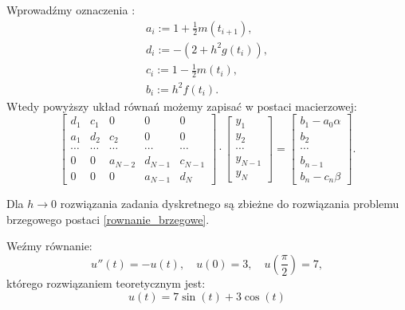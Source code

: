 \documentclass[notheorems]{beamer}
\begin{document}
\begin{frame}
\begin{small}
Wprowadźmy oznaczenia :
\begin{align*}
a_i:= 1 + \frac{1}{2}m(t_{i+1}),\\
d_i:= -(2+h^2 g(t_i)), \\
c_i:= 1 - \frac{1}{2}m(t_i), \\
b_i:= h^2 f(t_i).
\end{align*}
Wtedy powyższy układ równań możemy zapisać w postaci macierzowej:
\begin{equation}\label{macierz}
\left[ \begin{array}{ccccc}
d_1 & c_1 & 0 & 0 & 0 \\
a_1 & d_2 & c_2 & 0 & 0\\
\cdots & \cdots & \cdots &\cdots  &\cdots \\
0 & 0 & a_{N-2} & d_{N-1} & c_{N-1}\\
0 & 0 & 0 & a_{N-1} & d_N 
\end{array} \right] \cdot
\left[ \begin{array}{c}
y_1 \\
y_2 \\
\cdots \\
y_{N-1} \\
y_{N}  
\end{array} \right] =
\left[ \begin{array}{c}
b_1 - a_0\alpha\\
b_2 \\
\cdots \\
b_{n-1} \\
b_n -c_n\beta 
\end{array} \right] .
\end{equation}
\end{small}
\end{frame}
\begin{frame}
\begin{theorem}
Dla $h \to 0$ rozwiązania zadania dyskretnego są zbieżne do rozwiązania problemu brzegowego postaci \eqref{rownanie_brzegowe}.
\end{theorem}
\end{frame}
\begin{frame}
\begin{example}
Weźmy równanie:
$$
u''(t)= -u(t), \quad u(0)=3, \quad u(\frac{\pi}{2}) = 7,
$$
którego rozwiązaniem teoretycznym jest:
$$
u(t) = 7\sin(t) + 3\cos(t)
$$
\end{example}
\end{frame}
\end{document}
